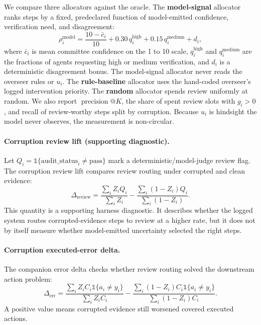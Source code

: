 \documentclass[10pt,twocolumn]{article}
\newcommand{\indicator}{\mathbb{1}}
\begin{document}
We compare three allocators against the oracle. The \textbf{model-signal} allocator ranks steps by a fixed, predeclared function of model-emitted confidence, verification need, and disagreement:
\begin{equation}
\rho_i^{\mathrm{model}}=
\frac{10-\bar c_i}{10}
 +0.30\,q_i^{\mathrm{high}}
 +0.15\,q_i^{\mathrm{medium}}
 +d_i,
\label{eq:model-signal}
\end{equation}
where \(\bar c_i\) is mean committee confidence on the 1 to 10 scale, \(q_i^{\mathrm{high}}\) and \(q_i^{\mathrm{medium}}\) are the fractions of agents requesting high or medium verification, and \(d_i\) is a deterministic disagreement bonus. The model-signal allocator never reads the overseer rules or \(u_i\). The \textbf{rule-baseline} allocator uses the hand-coded overseer's logged intervention priority. The \textbf{random} allocator spends review uniformly at random. We also report \(\operatorname{precision}@K\), the share of spent review slots with \(g_i>0\), and recall of review-worthy steps split by corruption. Because \(u_i\) is hindsight the model never observes, the measurement is non-circular.

\paragraph{Corruption review lift (supporting diagnostic).}
Let \(Q_i=\indicator\{\mathrm{audit\_status}_i\neq \mathrm{pass}\}\) mark a deterministic/model-judge review flag. The corruption review lift compares review routing under corrupted and clean evidence:
\begin{equation}
\Delta_{\mathrm{review}} =
\frac{\sum_i Z_i Q_i}{\sum_i Z_i}
-
\frac{\sum_i (1-Z_i)Q_i}{\sum_i (1-Z_i)}.
\label{eq:corruption-review-lift}
\end{equation}
This quantity is a supporting harness diagnostic. It describes whether the logged system routes corrupted-evidence steps to review at a higher rate, but it does not by itself measure whether model-emitted uncertainty selected the right steps.

\paragraph{Corruption executed-error delta.}
The companion error delta checks whether review routing solved the downstream action problem:
\begin{equation}
\Delta_{\mathrm{err}} =
\frac{\sum_i Z_i C_i\indicator\{a_i\neq y_i\}}{\sum_i Z_i C_i}
-
\frac{\sum_i (1-Z_i)C_i\indicator\{a_i\neq y_i\}}{\sum_i (1-Z_i)C_i}.
\label{eq:corruption-error-delta}
\end{equation}
A positive value means corrupted evidence still worsened covered executed actions.
\end{document}
